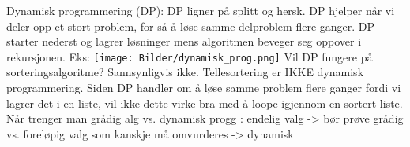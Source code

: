\documentclass[10pt,a4paper]{article}
\begin{document}
\begin{multicols}{4}
{\noindent
\color{orange}Dynamisk programmering (DP): \color{black} DP ligner på splitt og hersk. DP hjelper når vi deler opp et stort problem,
for så å løse samme delproblem flere ganger. DP starter nederst og lagrer løsninger mens algoritmen beveger seg oppover i rekursjonen. Eks: \texttt{[image: Bilder/dynamisk\_prog.png]} Vil DP fungere på sorteringsalgoritme? Sannsynligvis ikke. Tellesortering er IKKE dynamisk programmering. Siden DP handler om å løse samme problem flere ganger fordi vi lagrer det i en liste, vil ikke dette virke bra med å loope igjennom en sortert liste. Når trenger man grådig alg vs. dynamisk progg : endelig valg -> bør prøve grådig vs. foreløpig valg som kanskje må omvurderes -> dynamisk


}
\end{multicols}
\end{document}
